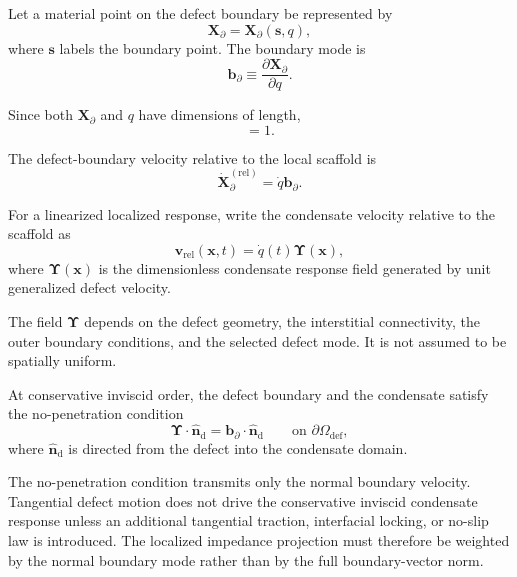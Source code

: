 Let a material point on the defect boundary be represented by
\begin{equation}
    \mathbf{X}_{\partial} = \mathbf{X}_{\partial}(\boldsymbol{s},q),
\end{equation}
where $\boldsymbol{s}$ labels the boundary point. The boundary mode is
\begin{equation}
    \mathbf{b}_{\partial} \equiv \frac{\partial\mathbf{X}_{\partial}}{\partial q}.
\end{equation}

Since both $\mathbf{X}_{\partial}$ and $q$ have dimensions of length,
\begin{equation}
    [\mathbf{b}_{\partial}]=1.
\end{equation}

The defect-boundary velocity relative to the local scaffold is
\begin{equation}
    \dot{\mathbf{X}}_{\partial}^{(\mathrm{rel})} = \dot{q}\mathbf{b}_{\partial}.
\end{equation}

For a linearized localized response, write the condensate velocity relative to the scaffold as
\begin{equation}
    \mathbf{v}_{\mathrm{rel}}(\mathbf{x},t) = \dot{q}(t) \boldsymbol{\Upsilon}(\mathbf{x}),
\end{equation}
where $\boldsymbol{\Upsilon}(\mathbf{x})$ is the dimensionless condensate response field generated by unit generalized defect velocity.

The field $\boldsymbol{\Upsilon}$ depends on the defect geometry, the interstitial connectivity, the outer boundary conditions, and the selected defect mode. It is not assumed to be spatially uniform.

At conservative inviscid order, the defect boundary and the condensate satisfy the no-penetration condition
\begin{equation}
    \boxed{ \boldsymbol{\Upsilon}\cdot\hat{\mathbf n}_{\mathrm d} = \mathbf b_{\partial}\cdot\hat{\mathbf n}_{\mathrm d} \qquad \text{on } \partial\Omega_{\mathrm{def}} },
\end{equation}
where $\hat{\mathbf n}_{\mathrm d}$ is directed from the defect into the condensate domain.

The no-penetration condition transmits only the normal boundary velocity. Tangential defect motion does not drive the conservative inviscid condensate response unless an additional tangential traction, interfacial locking, or no-slip law is introduced. The localized impedance projection must therefore be weighted by the normal boundary mode rather than by the full boundary-vector norm.

